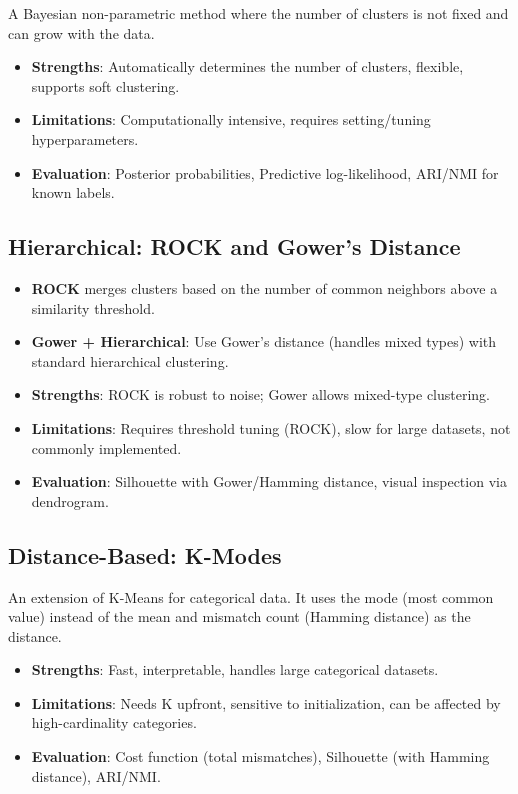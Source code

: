 \documentclass[
  letterpaper,
  DIV=11,
  numbers=noendperiod]{scrartcl}
\providecommand{\tightlist}{%
  \setlength{\itemsep}{0pt}\setlength{\parskip}{0pt}}\usepackage{longtable,booktabs,array}
\begin{document}
A Bayesian non-parametric method where the number of clusters is not
fixed and can grow with the data.

\begin{itemize}
\tightlist
\item
  \textbf{Strengths}: Automatically determines the number of clusters,
  flexible, supports soft clustering.
\item
  \textbf{Limitations}: Computationally intensive, requires
  setting/tuning hyperparameters.
\item
  \textbf{Evaluation}: Posterior probabilities, Predictive
  log-likelihood, ARI/NMI for known labels.
\end{itemize}

\subsection{Hierarchical: ROCK and Gower's
Distance}\label{hierarchical-rock-and-gowers-distance}

\begin{itemize}
\item
  \textbf{ROCK} merges clusters based on the number of common neighbors
  above a similarity threshold.
\item
  \textbf{Gower + Hierarchical}: Use Gower's distance (handles mixed
  types) with standard hierarchical clustering.
\item
  \textbf{Strengths}: ROCK is robust to noise; Gower allows mixed-type
  clustering.
\item
  \textbf{Limitations}: Requires threshold tuning (ROCK), slow for large
  datasets, not commonly implemented.
\item
  \textbf{Evaluation}: Silhouette with Gower/Hamming distance, visual
  inspection via dendrogram.
\end{itemize}

\subsection{Distance-Based: K-Modes}\label{distance-based-k-modes}

An extension of K-Means for categorical data. It uses the mode (most
common value) instead of the mean and mismatch count (Hamming distance)
as the distance.

\begin{itemize}
\tightlist
\item
  \textbf{Strengths}: Fast, interpretable, handles large categorical
  datasets.
\item
  \textbf{Limitations}: Needs K upfront, sensitive to initialization,
  can be affected by high-cardinality categories.
\item
  \textbf{Evaluation}: Cost function (total mismatches), Silhouette
  (with Hamming distance), ARI/NMI.
\end{itemize}
\end{document}
